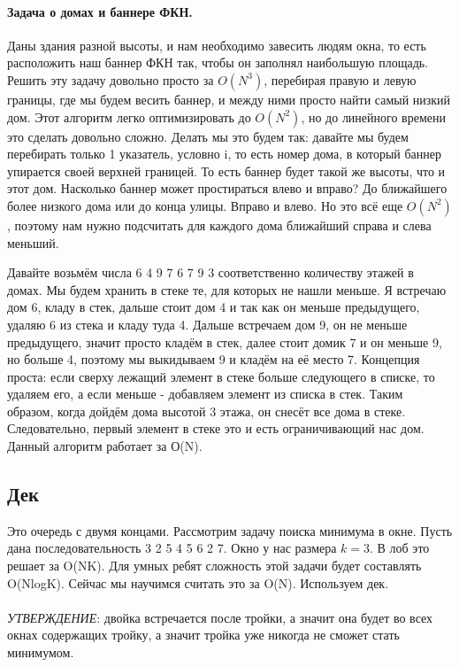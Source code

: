 \documentclass[12pt]{article}
\begin{document}
\paragraph{Задача о домах и баннере ФКН.}
Даны здания разной высоты, и нам необходимо завесить людям окна, то есть расположить наш баннер ФКН так, чтобы он заполнял наибольшую площадь. Решить эту задачу довольно просто за $O(N^3)$, перебирая правую и левую границы, где мы будем весить баннер, и между ними просто найти самый низкий дом. Этот алгоритм легко оптимизировать до $O(N^2)$, но до линейного времени это сделать довольно сложно. Делать мы это будем так: давайте мы будем перебирать только 1 указатель, условно i, то есть номер дома, в который баннер упирается своей верхней границей. То есть баннер будет такой же высоты, что и этот дом. Насколько баннер может простираться влево и вправо? До ближайшего более низкого дома или до конца улицы. Вправо и влево. Но это всё еще $O(N^2)$, поэтому нам нужно подсчитать для каждого дома ближайший справа и слева меньший.

Давайте возьмём числа 6 4 9 7 6 7 9 3 соответственно количеству этажей в домах. Мы будем хранить в стеке те, для которых не нашли меньше. Я встречаю дом 6, кладу в стек, дальше стоит дом 4 и так как он меньше предыдущего, удаляю 6 из стека и кладу туда 4. Дальше встречаем дом 9, он не меньше предыдущего, значит просто кладём в стек, далее стоит домик 7 и он меньше 9, но больше 4, поэтому мы выкидываем 9 и кладём на её место 7. Концепция проста: если сверху лежащий элемент в стеке больше следующего в списке, то удаляем его, а если меньше - добавляем элемент из списка в стек. Таким образом, когда дойдём дома высотой 3 этажа, он снесёт все дома в стеке. Следовательно, первый элемент в стеке это и есть ограничивающий нас дом. Данный алгоритм работает за О(N).

\subsection*{Дек}
Это очередь с двумя концами. Рассмотрим задачу поиска минимума в окне. Пусть дана последовательность 3 2 5 4 5 6 2 7. Окно у нас размера $k = 3$. В лоб это решает за O(NK). Для умных ребят сложность этой задачи будет составлять O(NlogK). Сейчас мы научимся считать это за O(N). Используем дек. \\
\\
\textit{УТВЕРЖДЕНИЕ}: двойка встречается после тройки, а значит она будет во всех окнах содержащих тройку, а значит тройка уже никогда не сможет стать минимумом.\\
\end{document}
